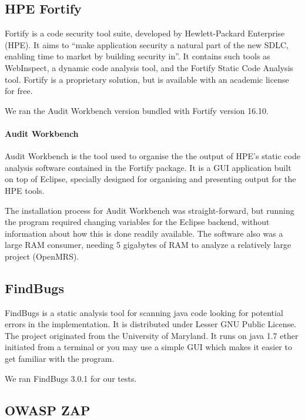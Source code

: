 \documentclass{report} %
\begin{document}
\subsection{HPE Fortify}

  Fortify is a code security tool suite, developed by Hewlett-Packard
  Enterprise (HPE). It aims to ``make application security a natural part of the new
  SDLC, enabling time to market by building security in''\autocite[]{Fortify}.
  It contains such tools as WebInspect, a dynamic code analysis tool, and the
  Fortify Static Code Analysis tool. Fortify is a proprietary solution, but is
  available with an academic license for free.

  We ran the Audit Workbench version bundled with Fortify version 16.10.

\paragraph{Audit Workbench}

  Audit Workbench is the tool used to organise the the output of HPE's static
  code analysis software contained in the Fortify package. It is a GUI
  application built on top of Eclipse, specially designed for organising and
  presenting output for the HPE tools. 
  
  The installation process for Audit Workbench was straight-forward, but running
  the program required changing variables for the Eclipse backend, without
  information about how this is done readily available. The software also was a
  large RAM consumer, needing 5 gigabytes of RAM to analyze a relatively large
  project (OpenMRS).

\subsection{FindBugs}

FindBugs is a static analysis tool for scanning java code looking for potential errors in the
implementation. It is distributed under Lesser GNU Public License. The project
originated from the University of Maryland.\autocite[]{FindBugs} It runs on java
1.7 ether initiated from a terminal or you may use a simple GUI which makes it
easier to get familiar with the program. 

We ran FindBugs 3.0.1 for our tests.
 

\subsection{OWASP ZAP}
\end{document}

